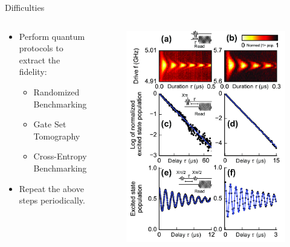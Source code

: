 \documentclass[11pt]{beamer}
\begin{document}
\begin{frame}{Difficulties}
\begin{columns}
\begin{column}{0.5 \textwidth}
\begin{itemize}
\begin{itemize}
                \end{itemize}
                \item[\faCaretSquareORight] Perform quantum protocols to extract the fidelity:
                \begin{itemize}
                    \item[\faWrench] Randomized Benchmarking
                    \item[\faWrench] Gate Set Tomography
                    \item[\faWrench] Cross-Entropy Benchmarking
                \end{itemize}
                \item[\faCaretSquareORight] Repeat the above steps periodically.
            \end{itemize}
        \end{column}
        \begin{column}{0.5 \textwidth}
            \begin{figure}
                \includegraphics[width = 0.8 \textwidth]{figures/characterization.png}
            \end{figure}
            
        \end{column}
    \end{columns}
    

\end{frame}
\end{document}
